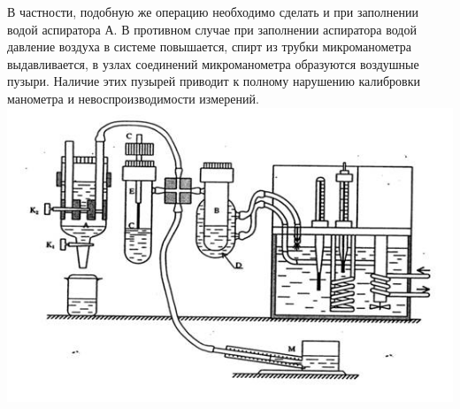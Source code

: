 \documentclass[12pt,a4paper]{article}
\begin{document}
В частности, подобную же операцию необходимо сделать и при заполнении водой аспиратора А. В противном случае при заполнении аспиратора водой давление воздуха в системе повышается, спирт из трубки микроманометра выдавливается, в узлах соединений микроманометра образуются воздушные пузыри. Наличие этих пузырей приводит к полному нарушению калибровки манометра и невоспроизводимости измерений.\\
    \includegraphics[scale=0.8]{image001_35.jpg}
\end{document}
